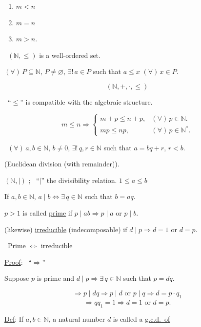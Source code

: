 \begin{enumerate}
\item[(1)] $m<n$
\item[(2)] $m=n$
\item[(3)] $m>n$.
\end{enumerate}

\bigskip
\noindent{} \ $(\mathbb{N},\leq)$ is a well-ordered set.

\noindent $(\forall)\,P\subseteq\mathbb{N}$, $P\neq\varnothing$, $\exists!\,a\in P$ such that $a\leq x$ $(\forall)\,x\in P$.

\[
(\mathbb{N},+,\cdot,\leq)
\]

\bigskip
\noindent{} \ ``$\leq$'' is compatible with the algebraic structure.

\[
m\leq n \Rightarrow
\begin{cases}
m+p\leq n+p, & (\forall)\,p\in\mathbb{N}.\\
mp\leq np, & (\forall)\,p\in\mathbb{N}^*.
\end{cases}
\]

\bigskip
\noindent{} \ $(\forall)\,a,b\in\mathbb{N}$, $b\neq 0$, $\exists!\,q,r\in\mathbb{N}$ such that $a=bq+r$, $r<b$.

\noindent (Euclidean division (with remainder)).

\bigskip
\noindent $(\mathbb{N},\mid)$ ; \ ``$\mid$'' the divisibility relation. \hfill $1\leq a\leq b$

\noindent If $a,b\in\mathbb{N}$, $a\mid b \Leftrightarrow \exists\,q\in\mathbb{N}$ such that $b=aq$.

\bigskip
\noindent $p>1$ is called \underline{prime} if $p\mid ab \Rightarrow p\mid a$ or $p\mid b$.

\noindent (likewise) \underline{irreducible} (indecomposable) if $d\mid p \Rightarrow d=1$ or $d=p$.

\bigskip
\noindent{} \ Prime $\Leftrightarrow$ irreducible

\bigskip
\noindent\underline{Proof}: \ ``$\Rightarrow$''

\noindent Suppose $p$ is prime and $d\mid p \Rightarrow \exists\,q\in\mathbb{N}$ such that $p=dq$.

\[
\Rightarrow p\mid dq \Rightarrow p\mid d \text{ or } p\mid q \Rightarrow \underline{d=p\cdot q_1}
\]
\[
\Rightarrow qq_1=1 \Rightarrow d=1 \text{ or } d=p.
\]

\bigskip
\noindent\underline{Def}: If $a,b\in\mathbb{N}$, a natural number $d$ is called a \underline{g.c.d.\ of}

